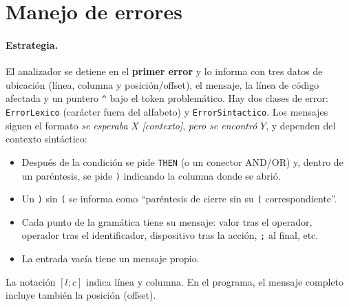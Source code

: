 \section{Manejo de errores}

\paragraph{Estrategia.} El analizador se detiene en el \textbf{primer error} y lo informa con tres datos de ubicación
(línea, columna y posición/offset), el mensaje, la línea de código afectada y un puntero \texttt{\^{}} bajo el token problemático.
Hay dos clases de error: \texttt{ErrorLexico} (carácter fuera del alfabeto) y \texttt{ErrorSintactico}.
Los mensajes siguen el formato \emph{se esperaba} $X$ \emph{[contexto]}, \emph{pero se encontró} $Y$, y dependen del contexto sintáctico:
\begin{itemize}[nosep]
\item Después de la condición se pide \texttt{THEN} (o un conector AND/OR) y, dentro de un paréntesis, se pide \texttt{)} indicando la columna donde se abrió.
\item Un \texttt{)} sin \texttt{(} se informa como ``paréntesis de cierre sin su \texttt{(} correspondiente''.
\item Cada punto de la gramática tiene su mensaje: valor tras el operador, operador tras el identificador, dispositivo tras la acción, \texttt{;} al final, etc.
\item La entrada vacía tiene un mensaje propio.
\end{itemize}
La notación $[l{:}c]$ indica línea y columna. En el programa, el mensaje completo incluye también la posición (offset).

